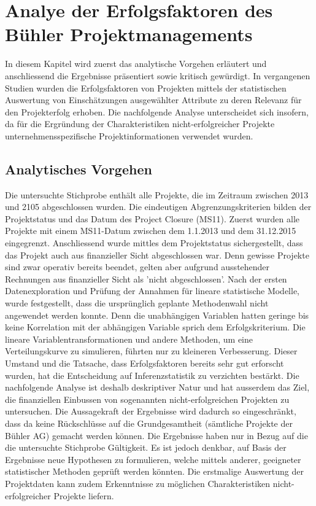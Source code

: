 \section{Analye der Erfolgsfaktoren des Bühler Projektmanagements}\label{drei}
In diesem Kapitel wird zuerst das analytische Vorgehen erläutert und anschliessend die Ergebnisse präsentiert sowie kritisch gewürdigt. In vergangenen Studien wurden die Erfolgsfaktoren von Projekten mittels der statistischen Auswertung von Einschätzungen ausgewählter Attribute zu deren Relevanz für den Projekterfolg erhoben. Die nachfolgende Analyse unterscheidet sich insofern, da für die Ergründung der Charakteristiken nicht-erfolgreicher Projekte unternehmensspezifische Projektinformationen verwendet wurden.
\subsection{Analytisches Vorgehen}
Die untersuchte Stichprobe enthält alle Projekte, die im Zeitraum zwischen 2013 und 2105 abgeschlossen wurden. Die eindeutigen Abgrenzungskriterien bilden der Projektstatus und das Datum des Project Closure (MS11). Zuerst wurden alle Projekte mit einem MS11-Datum zwischen dem 1.1.2013 und dem 31.12.2015 eingegrenzt. Anschliessend wurde mittles dem Projektstatus sichergestellt, dass das Projekt auch aus finanzieller Sicht abgeschlossen war. Denn gewisse Projekte sind zwar operativ bereits beendet, gelten aber aufgrund ausstehender Rechnungen aus finanzieller Sicht als 'nicht abgeschlossen'.
\newline Nach der ersten Datenexploration und Prüfung der Annahmen für lineare statistische Modelle, wurde festgestellt, dass die ursprünglich geplante Methodenwahl nicht angewendet werden konnte. Denn die unabhängigen Variablen hatten geringe bis keine Korrelation mit der abhängigen Variable sprich dem Erfolgskriterium. Die lineare Variablentransformationen und andere Methoden, um eine Verteilungskurve zu simulieren, führten nur zu kleineren Verbesserung. Dieser Umstand und die Tatsache, dass Erfolgsfaktoren bereits sehr gut erforscht wurden, hat die Entscheidung auf Inferenzstatistik zu verzichten bestärkt. Die nachfolgende Analyse ist deshalb deskriptiver Natur und hat ausserdem das Ziel, die finanziellen Einbussen von sogenannten nicht-erfolgreichen Projekten zu untersuchen. Die Aussagekraft der Ergebnisse wird dadurch so eingeschränkt, dass da keine Rückschlüsse auf die Grundgesamtheit (sämtliche Projekte der Bühler AG) gemacht werden können.  Die Ergebnisse haben nur in Bezug auf die die untersuchte Stichprobe Gültigkeit. Es ist jedoch denkbar, auf Basis der Ergebnisse neue Hypothesen zu formulieren, welche mittels anderer, geeigneter statistischer Methoden geprüft werden könnten. Die erstmalige Auswertung der Projektdaten kann zudem Erkenntnisse zu möglichen Charakteristiken nicht-erfolgreicher Projekte liefern.
